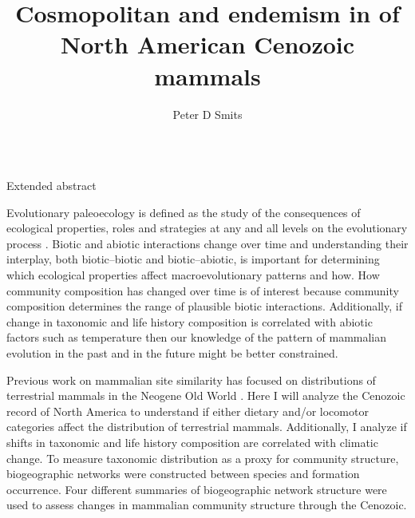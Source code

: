 \documentclass[final]{beamer}\usepackage[]{graphicx}\usepackage[]{color}
\title{Cosmopolitan and endemism in of North American Cenozoic mammals}
\author{Peter D Smits}
\institute{Committee on Evolutionary Biology, University of Chicago}
\newlength{\onecolwid}
\begin{document}
\begin{frame}[t]
  \begin{columns}[t]
    \begin{column}{\onecolwid}
    \begin{block}{Extended abstract}
%

  \alert{Evolutionary paleoecology is defined as the study of the consequences of ecological properties, roles and strategies at any and all levels on the evolutionary process \citep{Kitchell1985a}.} Biotic and abiotic interactions change over time and understanding their interplay, both biotic--biotic and biotic--abiotic, is important for determining which ecological properties affect macroevolutionary patterns and how.
  \alert{How community composition has changed over time is of interest because community composition determines the range of plausible biotic interactions.} Additionally, if change in taxonomic and life history composition is correlated with abiotic factors such as temperature then our knowledge of the pattern of mammalian evolution in the past and in the future might be better constrained.

        Previous work on mammalian site similarity has focused on distributions of terrestrial mammals in the Neogene Old World \citep{Jernvall2002,Jernvall2004}. 
        \alert{Here I will analyze the Cenozoic record of North America to understand if either dietary and/or locomotor categories affect the distribution of terrestrial mammals. Additionally, I analyze if shifts in taxonomic and life history composition are correlated with climatic change.}
        To measure taxonomic distribution as a proxy for community structure, biogeographic networks were constructed between species and formation occurrence. Four different summaries of biogeographic network structure were used to assess changes in mammalian community structure through the Cenozoic.
      \end{block}


\end{column}
\end{columns}
\end{frame}
\end{document}
